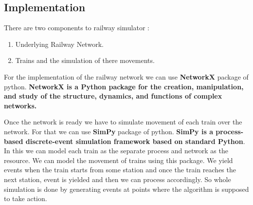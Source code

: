 \subsection{Implementation}
There are two components to railway simulator :
\begin{enumerate}
    \item Underlying Railway Network. 
    \item Trains and the simulation of there movements.
\end{enumerate}

For the implementation of the railway network we can use \textbf{NetworkX}\cite{WEBSITE:4} package of python.
\textbf{NetworkX is a Python package for the creation, manipulation,
and study of the structure, dynamics, and functions of complex networks.}
\vspace{1.5cm}

Once the network is ready we have to simulate movement of each train over the network. For 
that we can use \textbf{SimPy}\cite{WEBSITE:5} package of python. \textbf{SimPy is a process-based discrete-event simulation framework based on standard Python}.
In this we can model each train as the separate process and network as the resource. We can 
model the movement of trains using this package. We yield events when the train starts from some station and once 
the train reaches the next station, event is yielded and then we can process accordingly. So whole simulation is done 
by generating events at points where the algorithm is supposed to take action.


